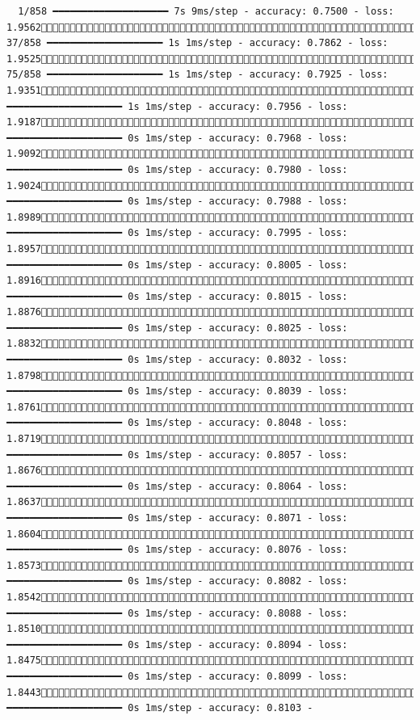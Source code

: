 \documentclass[
  letterpaper,
  DIV=11,
  numbers=noendperiod]{scrartcl}
\begin{document}
\begin{verbatim}
  1/858 ━━━━━━━━━━━━━━━━━━━━ 7s 9ms/step - accuracy: 0.7500 - loss: 1.9562 37/858 ━━━━━━━━━━━━━━━━━━━━ 1s 1ms/step - accuracy: 0.7862 - loss: 1.9525 75/858 ━━━━━━━━━━━━━━━━━━━━ 1s 1ms/step - accuracy: 0.7925 - loss: 1.9351112/858 ━━━━━━━━━━━━━━━━━━━━ 1s 1ms/step - accuracy: 0.7956 - loss: 1.9187147/858 ━━━━━━━━━━━━━━━━━━━━ 0s 1ms/step - accuracy: 0.7968 - loss: 1.9092184/858 ━━━━━━━━━━━━━━━━━━━━ 0s 1ms/step - accuracy: 0.7980 - loss: 1.9024217/858 ━━━━━━━━━━━━━━━━━━━━ 0s 1ms/step - accuracy: 0.7988 - loss: 1.8989251/858 ━━━━━━━━━━━━━━━━━━━━ 0s 1ms/step - accuracy: 0.7995 - loss: 1.8957284/858 ━━━━━━━━━━━━━━━━━━━━ 0s 1ms/step - accuracy: 0.8005 - loss: 1.8916320/858 ━━━━━━━━━━━━━━━━━━━━ 0s 1ms/step - accuracy: 0.8015 - loss: 1.8876357/858 ━━━━━━━━━━━━━━━━━━━━ 0s 1ms/step - accuracy: 0.8025 - loss: 1.8832386/858 ━━━━━━━━━━━━━━━━━━━━ 0s 1ms/step - accuracy: 0.8032 - loss: 1.8798416/858 ━━━━━━━━━━━━━━━━━━━━ 0s 1ms/step - accuracy: 0.8039 - loss: 1.8761448/858 ━━━━━━━━━━━━━━━━━━━━ 0s 1ms/step - accuracy: 0.8048 - loss: 1.8719483/858 ━━━━━━━━━━━━━━━━━━━━ 0s 1ms/step - accuracy: 0.8057 - loss: 1.8676518/858 ━━━━━━━━━━━━━━━━━━━━ 0s 1ms/step - accuracy: 0.8064 - loss: 1.8637553/858 ━━━━━━━━━━━━━━━━━━━━ 0s 1ms/step - accuracy: 0.8071 - loss: 1.8604588/858 ━━━━━━━━━━━━━━━━━━━━ 0s 1ms/step - accuracy: 0.8076 - loss: 1.8573623/858 ━━━━━━━━━━━━━━━━━━━━ 0s 1ms/step - accuracy: 0.8082 - loss: 1.8542660/858 ━━━━━━━━━━━━━━━━━━━━ 0s 1ms/step - accuracy: 0.8088 - loss: 1.8510698/858 ━━━━━━━━━━━━━━━━━━━━ 0s 1ms/step - accuracy: 0.8094 - loss: 1.8475732/858 ━━━━━━━━━━━━━━━━━━━━ 0s 1ms/step - accuracy: 0.8099 - loss: 1.8443762/858 ━━━━━━━━━━━━━━━━━━━━ 0s 1ms/step - accuracy: 0.8103 - 
\end{verbatim}
\end{document}
